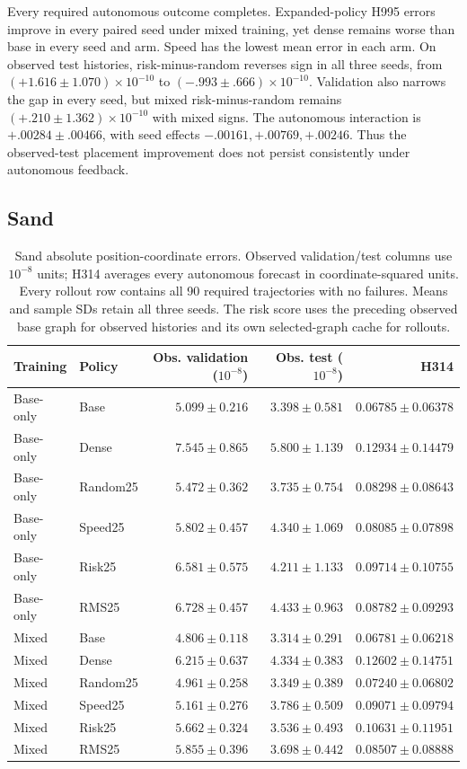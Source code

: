 Every required autonomous outcome completes. Expanded-policy H995 errors improve in every paired seed under mixed training, yet dense remains worse than base in every seed and arm. Speed has the lowest mean error in each arm. On observed test histories, risk-minus-random reverses sign in all three seeds, from $(+1.616\pm1.070)\times10^{-10}$ to $(-.993\pm.666)\times10^{-10}$. Validation also narrows the gap in every seed, but mixed risk-minus-random remains $(+.210\pm1.362)\times10^{-10}$ with mixed signs. The autonomous interaction is $+.00284\pm.00466$, with seed effects $-.00161,+.00769,+.00246$. Thus the observed-test placement improvement does not persist consistently under autonomous feedback.

\subsection{Sand}
\label{sec:sand-graph-exposure}
\begin{table}[!ht]
\centering\small
\setlength{\tabcolsep}{5pt}\renewcommand{\arraystretch}{1.12}
\caption{Sand absolute position-coordinate errors. Observed validation/test columns use $10^{-8}$ units; H314 averages every autonomous forecast in coordinate-squared units. Every rollout row contains all 90 required trajectories with no failures. Means and sample SDs retain all three seeds. The risk score uses the preceding observed base graph for observed histories and its own selected-graph cache for rollouts.}
\label{tab:sand-all-observed}
\label{tab:sand-all-rollouts}
\begin{tabular}{llrrr}
\toprule
Training & Policy & Obs. validation ($10^{-8}$) & Obs. test ($10^{-8}$) & H314\\
\midrule
Base-only & Base & $5.099\pm0.216$ & $3.398\pm0.581$ & $0.06785\pm0.06378$\\
Base-only & Dense & $7.545\pm0.865$ & $5.800\pm1.139$ & $0.12934\pm0.14479$\\
Base-only & Random25 & $5.472\pm0.362$ & $3.735\pm0.754$ & $0.08298\pm0.08643$\\
Base-only & Speed25 & $5.802\pm0.457$ & $4.340\pm1.069$ & $0.08085\pm0.07898$\\
Base-only & Risk25 & $6.581\pm0.575$ & $4.211\pm1.133$ & $0.09714\pm0.10755$\\
Base-only & RMS25 & $6.728\pm0.457$ & $4.433\pm0.963$ & $0.08782\pm0.09293$\\
Mixed & Base & $4.806\pm0.118$ & $3.314\pm0.291$ & $0.06781\pm0.06218$\\
Mixed & Dense & $6.215\pm0.637$ & $4.334\pm0.383$ & $0.12602\pm0.14751$\\
Mixed & Random25 & $4.961\pm0.258$ & $3.349\pm0.389$ & $0.07240\pm0.06802$\\
Mixed & Speed25 & $5.161\pm0.276$ & $3.786\pm0.509$ & $0.09071\pm0.09794$\\
Mixed & Risk25 & $5.662\pm0.324$ & $3.536\pm0.493$ & $0.10631\pm0.11951$\\
Mixed & RMS25 & $5.855\pm0.396$ & $3.698\pm0.442$ & $0.08507\pm0.08888$\\
\bottomrule
\end{tabular}
\end{table}

